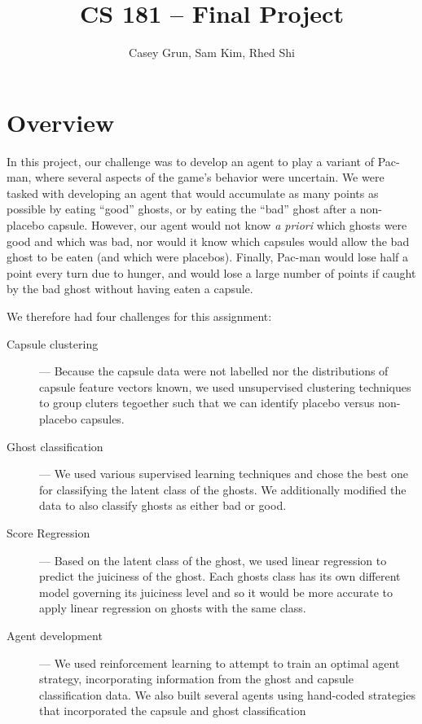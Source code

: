 \documentclass[11pt]{amsart}
\title{CS 181 -- Final Project}
\author{Casey Grun, Sam Kim, Rhed Shi}
\begin{document}
\maketitle

\section{Overview}

In this project, our challenge was to develop an agent to play a variant of Pac-man, where several aspects of the game's behavior were uncertain. We were tasked with developing an agent that would accumulate as many points as possible by eating ``good'' ghosts, or by eating the ``bad'' ghost after a non-placebo capsule. However, our agent would not know \emph{a priori} which ghosts were good and which was bad, nor would it know which capsules would allow the bad ghost to be eaten (and which were placebos). Finally, Pac-man would lose half a point every turn due to hunger, and would lose a large number of points if caught by the bad ghost without having eaten a capsule.

We therefore had four challenges for this assignment:
\begin{description}
	\item[Capsule clustering] --- Because the capsule data were not labelled nor the distributions of capsule feature vectors known, we used unsupervised clustering techniques to group cluters tegoether such that we can identify placebo versus non-placebo capsules.
	\item[Ghost classification] --- We used various supervised learning techniques and chose the best one for classifying the latent class of the ghosts. We additionally modified the data to also classify ghosts as either bad or good.
	\item[Score Regression] --- Based on the latent class of the ghost, we used linear regression to predict the juiciness of the ghost. Each ghosts class has its own different model governing its juiciness level and so it would be more accurate to apply linear regression on ghosts with the same class. 
	\item[Agent development] --- We used reinforcement learning to attempt to train an optimal agent strategy, incorporating information from the ghost and capsule classification data. We also built several agents using hand-coded strategies that incorporated the capsule and ghost classification 
\end{description}
\end{document}
